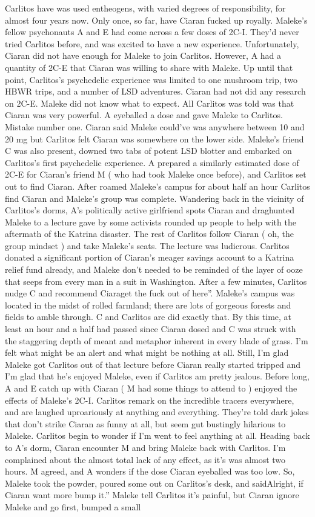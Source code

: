 \documentclass[12pt]{book}
\begin{document}
Carlitos have was used entheogens, with varied degrees of responsibility, for almost four years now. Only once, so far, have Ciaran fucked up royally. Maleke's fellow psychonauts A and E had come across a few doses of 2C-I. They'd never tried Carlitos before, and was excited to have a new experience. Unfortunately, Ciaran did not have enough for Maleke to join Carlitos. However, A had a quantity of 2C-E that Ciaran was willing to share with Maleke. Up until that point, Carlitos's psychedelic experience was limited to one mushroom trip, two HBWR trips, and a number of LSD adventures. Ciaran had not did any research on 2C-E. Maleke did not know what to expect. All Carlitos was told was that Ciaran was very powerful. A eyeballed a dose and gave Maleke to Carlitos. Mistake number one. Ciaran said Maleke could've was anywhere between 10 and 20 mg but Carlitos felt Ciaran was somewhere on the lower side. Maleke's friend C was also present, downed two tabs of potent LSD blotter and embarked on Carlitos's first psychedelic experience. A prepared a similarly estimated dose of 2C-E for Ciaran's friend M ( who had took Maleke once before), and Carlitos set out to find Ciaran. After roamed Maleke's campus for about half an hour Carlitos find Ciaran and Maleke's group was complete. Wandering back in the vicinity of Carlitos's dorms, A's politically active girlfriend spots Ciaran and draghunted Maleke to a lecture gave by some activists rounded up people to help with the aftermath of the Katrina disaster. The rest of Carlitos follow Ciaran ( oh, the group mindset ) and take Maleke's seats. The lecture was ludicrous. Carlitos donated a significant portion of Ciaran's meager savings account to a Katrina relief fund already, and Maleke don't needed to be reminded of the layer of ooze that seeps from every man in a suit in Washington. After a few minutes, Carlitos nudge C and recommend Ciaraget the fuck out of here''. Maleke's campus was located in the midst of rolled farmland; there are lots of gorgeous forests and fields to amble through. C and Carlitos are did exactly that. By this time, at least an hour and a half had passed since Ciaran dosed and C was struck with the staggering depth of meant and metaphor inherent in every blade of grass. I'm felt what might be an alert and what might be nothing at all. Still, I'm glad Maleke got Carlitos out of that lecture before Ciaran really started tripped and I'm glad that he's enjoyed Maleke, even if Carlitos am pretty jealous. Before long, A and E catch up with Ciaran ( M had some things to attend to ) enjoyed the effects of Maleke's 2C-I. Carlitos remark on the incredible tracers everywhere, and are laughed uproariously at anything and everything. They're told dark jokes that don't strike Ciaran as funny at all, but seem gut bustingly hilarious to Maleke. Carlitos begin to wonder if I'm went to feel anything at all. Heading back to A's dorm, Ciaran encounter M and bring Maleke back with Carlitos. I'm complained about the almost total lack of any effect, as it's was almost two hours. M agreed, and A wonders if the dose Ciaran eyeballed was too low. So, Maleke took the powder, poured some out on Carlitos's desk, and saidAlright, if Ciaran want more bump it.'' Maleke tell Carlitos it's painful, but Ciaran ignore Maleke and go first, bumped a small 
\end{document}
